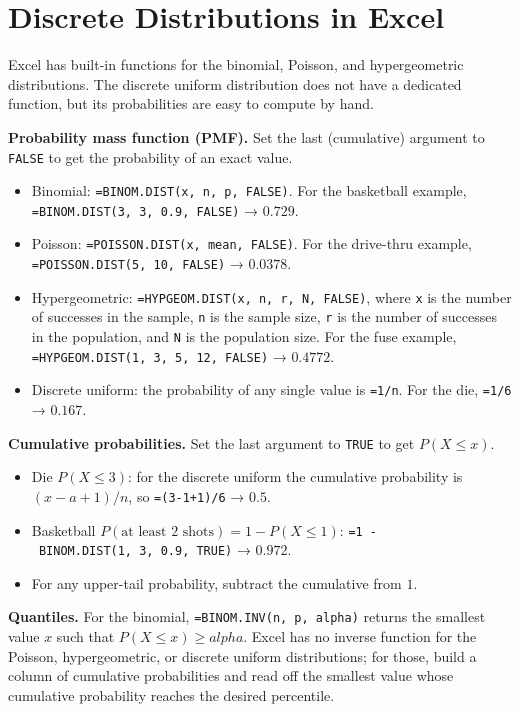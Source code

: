 \documentclass[
  11pt,
  letterpaper,
  DIV=11,
  numbers=noendperiod,
  oneside,
  open=any]{scrreprt}
\providecommand{\tightlist}{%
  \setlength{\itemsep}{0pt}\setlength{\parskip}{0pt}}\usepackage{longtable,booktabs,array}
\begin{document}
\section{Discrete Distributions in
Excel}\label{discrete-distributions-in-excel}

Excel has built-in functions for the binomial, Poisson, and
hypergeometric distributions. The discrete uniform distribution does not
have a dedicated function, but its probabilities are easy to compute by
hand.

\textbf{Probability mass function (PMF).} Set the last (cumulative)
argument to \texttt{FALSE} to get the probability of an exact value.

\begin{itemize}
\tightlist
\item
  Binomial: \texttt{=BINOM.DIST(x,\ n,\ p,\ FALSE)}. For the basketball
  example, \texttt{=BINOM.DIST(3,\ 3,\ 0.9,\ FALSE)} → \(0.729\).
\item
  Poisson: \texttt{=POISSON.DIST(x,\ mean,\ FALSE)}. For the drive-thru
  example, \texttt{=POISSON.DIST(5,\ 10,\ FALSE)} → \(0.0378\).
\item
  Hypergeometric: \texttt{=HYPGEOM.DIST(x,\ n,\ r,\ N,\ FALSE)}, where
  \texttt{x} is the number of successes in the sample, \texttt{n} is the
  sample size, \texttt{r} is the number of successes in the population,
  and \texttt{N} is the population size. For the fuse example,
  \texttt{=HYPGEOM.DIST(1,\ 3,\ 5,\ 12,\ FALSE)} → \(0.4772\).
\item
  Discrete uniform: the probability of any single value is
  \texttt{=1/n}. For the die, \texttt{=1/6} → \(0.167\).
\end{itemize}

\textbf{Cumulative probabilities.} Set the last argument to
\texttt{TRUE} to get \(P(X \le x)\).

\begin{itemize}
\tightlist
\item
  Die \(P(X \le 3)\): for the discrete uniform the cumulative
  probability is \((x-a+1)/n\), so \texttt{=(3-1+1)/6} → \(0.5\).
\item
  Basketball \(P(\text{at least 2 shots}) = 1 - P(X \le 1)\):
  \texttt{=1\ -\ BINOM.DIST(1,\ 3,\ 0.9,\ TRUE)} → \(0.972\).
\item
  For any upper-tail probability, subtract the cumulative from \(1\).
\end{itemize}

\textbf{Quantiles.} For the binomial, \texttt{=BINOM.INV(n,\ p,\ alpha)}
returns the smallest value \(x\) such that \(P(X \le x) \ge alpha\).
Excel has no inverse function for the Poisson, hypergeometric, or
discrete uniform distributions; for those, build a column of cumulative
probabilities and read off the smallest value whose cumulative
probability reaches the desired percentile.
\end{document}
